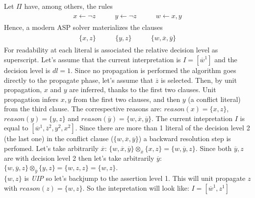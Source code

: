 \begin{example}\label{ex:unit-propagation}
    Let $\Pi$ have, among others, the rules
    \begin{align*}
        \begin{array}{ccc}
            x \leftarrow \neg z \qquad &
            y \leftarrow \neg z \qquad &
            w \leftarrow x, y
        \end{array}
    \end{align*}
    Hence, a modern ASP solver materializes the clauses
    \begin{align*}
        \begin{array}{ccc}
            \{x,z\} \qquad &
            \{y,z\} \qquad &
            \{w,\overline{x},\overline{y}\}
        \end{array}
    \end{align*}
    For readability at each literal is associated the relative decision level 
    as superscript.
    Let's assume that the current interpretation is 
    $I = [\overline{w}^1]$ and the decision level is $dl= 1$.
    Since no propagation is performed the algorithm goes 
    directly to the propagate phase, let's assume that 
    $\overline{z}$ is selected.
    Then, by unit propagation, $x$ and $y$ are inferred,
    thanks to the first two clauses.
    Unit propagation infers $x, y$ from the first two clauses, and then $y$ 
    (a conflict literal) from the third clause.
    The correspective reasons are: $reason(x) = \{ x, z \}$,
    $reason(y) = \{ y, z \}$ and $reason(\overline{y}) = \{w,\overline{x},\overline{y}\}$.
    The current intepretation $I$ is equal to
    $[\overline{w}^1,\overline{z}^2, y^2, x^2]$.
    Since there are more than 1 literal of the decision level 2 (the last one) in the conflict clause
    ($\{w,\overline{x},\overline{y}\}$)
    a backward resolution step is perfomed.
    Let's take arbitrarily $\overline{x}$:
    $\{w,\overline{x},\overline{y}\} \otimes_{\overline{x}} \{ x, z \}= \{w, \overline{y}, z\}$.
    Since both $\overline{y}, z$ are with decision level 2 then let's take arbitrarily $\overline{y}$:
    $\{w, \overline{y}, z\} \otimes_{\overline{y}} \{y,z\} = \{w, z, z\} = 
    \{w, z\}$.\\
    $\{w, z\}$ is \textit{UIP} so let's backjump to the assertion level 1.
    This will unit propagate $z$ with $reason(z) = \{w, z\}$.
    So the intepretation will look like: $I = [\overline{w}^1, z^1]$
\end{example}

